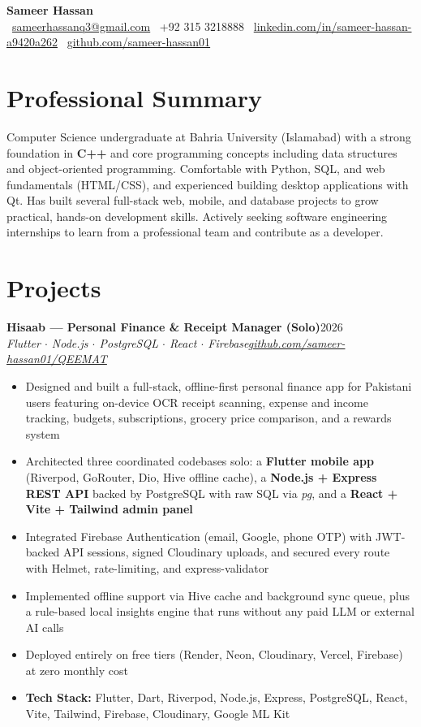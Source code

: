 \documentclass[10pt,a4paper]{article}
\newcommand{\cvheader}[5]{%
  \begin{center}
    {\Huge\bfseries #1}\\[6pt]
    {\small
      \faEnvelope\ \href{mailto:#2}{#2} \quad
      \faPhone\ #3 \quad
      \faLinkedin\ \href{https://#4}{#4} \quad
      \faGithub\ \href{https://#5}{#5}
    }
  \end{center}
}
\newcommand{\entry}[4]{%
  \vspace{4pt}
  \noindent\textbf{#1}\hfill #2\\
  \noindent\textit{#3}\hfill \textit{#4}\\
  \vspace{-6pt}
}
\begin{document}
\cvheader
  {Sameer Hassan}
  {sameerhassanq3@gmail.com}
  {+92 315 3218888}
  {linkedin.com/in/sameer-hassan-a9420a262}
  {github.com/sameer-hassan01}

\section*{Professional Summary}
Computer Science undergraduate at Bahria University (Islamabad) with a strong foundation in \textbf{C++} and core programming concepts including data structures and object-oriented programming. Comfortable with Python, SQL, and web fundamentals (HTML/CSS), and experienced building desktop applications with Qt. Has built several full-stack web, mobile, and database projects to grow practical, hands-on development skills. Actively seeking software engineering internships to learn from a professional team and contribute as a developer.

\section*{Projects}

\entry{Hisaab --- Personal Finance \& Receipt Manager (Solo)}{2026}
      {Flutter $\cdot$ Node.js $\cdot$ PostgreSQL $\cdot$ React $\cdot$ Firebase}
      {\href{https://github.com/sameer-hassan01/QEEMAT}{github.com/sameer-hassan01/QEEMAT}}
\begin{itemize}
  \item Designed and built a full-stack, offline-first personal finance app for Pakistani users featuring on-device OCR receipt scanning, expense and income tracking, budgets, subscriptions, grocery price comparison, and a rewards system
  \item Architected three coordinated codebases solo: a \textbf{Flutter mobile app} (Riverpod, GoRouter, Dio, Hive offline cache), a \textbf{Node.js + Express REST API} backed by PostgreSQL with raw SQL via \textit{pg}, and a \textbf{React + Vite + Tailwind admin panel}
  \item Integrated Firebase Authentication (email, Google, phone OTP) with JWT-backed API sessions, signed Cloudinary uploads, and secured every route with Helmet, rate-limiting, and express-validator
  \item Implemented offline support via Hive cache and background sync queue, plus a rule-based local insights engine that runs without any paid LLM or external AI calls
  \item Deployed entirely on free tiers (Render, Neon, Cloudinary, Vercel, Firebase) at zero monthly cost
  \item \textbf{Tech Stack:} Flutter, Dart, Riverpod, Node.js, Express, PostgreSQL, React, Vite, Tailwind, Firebase, Cloudinary, Google ML Kit
\end{itemize}
\end{document}
